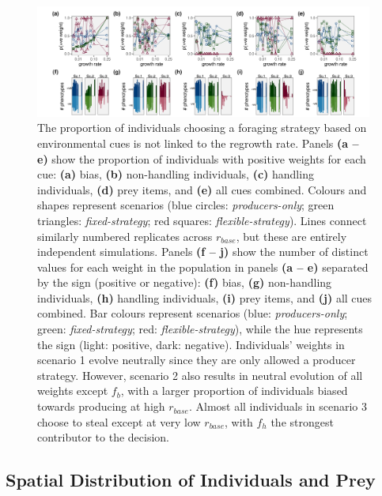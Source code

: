 \documentclass[11pt]{article}
\begin{document}
\begin{figure}[h]
    \centering
    \includegraphics[width=0.99\textwidth]{figures/fig_04_strategy_weight_end_vals.png}
    \caption{
        The proportion of individuals choosing a foraging strategy based on environmental cues is not linked to the regrowth rate.
        Panels \textbf{(a -- e)} show the proportion of individuals with positive weights for each cue: \textbf{(a)} bias, \textbf{(b)} non-handling individuals, \textbf{(c)} handling individuals, \textbf{(d)} prey items, and \textbf{(e)} all cues combined.
        Colours and shapes represent scenarios (blue circles: \textit{producers-only}; green triangles: \textit{fixed-strategy}; red squares: \textit{flexible-strategy}).
        Lines connect similarly numbered replicates across $r_{base}$, but these are entirely independent simulations.
        Panels \textbf{(f -- j)} show the number of distinct values for each weight in the population in panels \textbf{(a -- e)} separated by the sign (positive or negative): \textbf{(f)} bias, \textbf{(g)} non-handling individuals, \textbf{(h)} handling individuals, \textbf{(i)} prey items, and \textbf{(j)} all cues combined.
        Bar colours represent scenarios (blue: \textit{producers-only}; green: \textit{fixed-strategy}; red: \textit{flexible-strategy}), while the hue represents the sign (light: positive, dark: negative).
        Individuals' weights in scenario 1 evolve neutrally since they are only allowed a producer strategy.
        However, scenario 2 also results in neutral evolution of all weights except $f_b$, with a larger proportion of individuals biased towards producing at high $r_{base}$.
        Almost all individuals in scenario 3 choose to steal except at very low $r_{base}$, with $f_h$ the strongest contributor to the decision.
    }
    \label{fig:figure_pipeline}
\end{figure}

\subsection*{Spatial Distribution of Individuals and Prey}
\end{document}
